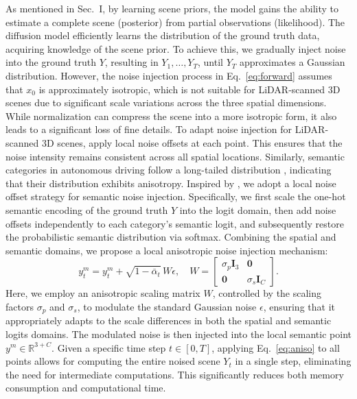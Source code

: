 \documentclass[conference]{IEEEtran}
\begin{document}
As mentioned in Sec.~I, by learning scene priors, the model gains the ability to estimate a complete scene (posterior) from partial observations (likelihood).
The diffusion model efficiently learns the distribution of the ground truth data, acquiring knowledge of the scene prior.
To achieve this, we gradually inject noise into the ground truth $Y$, resulting in $Y_1, \ldots, Y_T$, until $Y_T$ approximates a Gaussian distribution.
However, the noise injection process in Eq.~\eqref{eq:forward} assumes that $x_0$ is approximately isotropic, which is not suitable for LiDAR-scanned 3D scenes due to significant scale variations across the three spatial dimensions.
While normalization can compress the scene into a more isotropic form, it also leads to a significant loss of fine details.
To adapt noise injection for LiDAR-scanned 3D scenes, \cite{lnunes2025} apply local noise offsets at each point.
This ensures that the noise intensity remains consistent across all spatial locations.
Similarly, semantic categories in autonomous driving follow a long-tailed distribution \cite{jbehley2011}, indicating that their distribution exhibits anisotropy.
Inspired by \cite{lnunes2025}, we adopt a local noise offset strategy for semantic noise injection.
Specifically, we first scale the one-hot semantic encoding of the ground truth $Y$ into the logit domain, then add noise offsets independently to each category's semantic logit, and subsequently restore the probabilistic semantic distribution via softmax.
Combining the spatial and semantic domains, we propose a local anisotropic noise injection mechanism:
\begin{equation}
  y_t^m = y_t^m + \sqrt{1 - \bar{\alpha}_t}\, W\epsilon, \quad
  W = \begin{bmatrix} \sigma_p \mathbf{I}_3 & \mathbf{0} \\ \mathbf{0} & \sigma_s \mathbf{I}_C \end{bmatrix}.
  \label{eq:aniso}
\end{equation}
Here, we employ an anisotropic scaling matrix $W$, controlled by the scaling factors $\sigma_p$ and $\sigma_s$, to modulate the standard Gaussian noise $\epsilon$, ensuring that it appropriately adapts to the scale differences in both the spatial and semantic logits domains.
The modulated noise is then injected into the local semantic point $y^m \in \mathbb{R}^{3+C}$.
Given a specific time step $t \in [0, T]$, applying Eq.~\eqref{eq:aniso} to all points allows for computing the entire noised scene $Y_t$ in a single step, eliminating the need for intermediate computations.
This significantly reduces both memory consumption and computational time.
\end{document}
